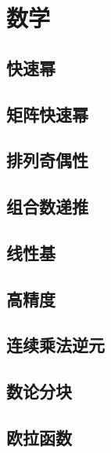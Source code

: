 \documentclass[twocolumn,a4]{article}  %
\begin{document}
	\section{数学}
		\subsection{快速幂}
	 	 	
	 	 	
		\subsection{矩阵快速幂}
	 	 	
	 	 	
		\subsection{排列奇偶性}
	 	 	
	 	 	
		\subsection{组合数递推}
	 	 	

		\subsection{线性基}
	 	 	

	 	\subsection{高精度}
	 	 	
	 	 	
	 	\subsection{连续乘法逆元}
	 	 	
	
	 	\subsection{数论分块}
	 	 	
	
	 	\subsection{欧拉函数}
	 	 	
	
\end{document}
